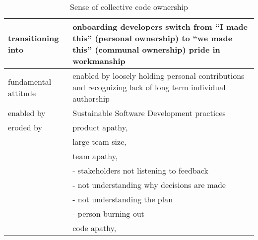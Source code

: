 \documentclass{sig-alternate-05-2015}
\newcommand{\quotes}[1]{``#1''}
\begin{document}
\begin{table*}[]
\centering
\caption{Sense of collective code ownership}
\label{Sense}
\begin{tabular}{p{1.5in}p{5.6in}}

transitioning into         & onboarding developers switch from \quotes{I made this} (personal ownership) to \quotes{we made this} (communal ownership) pride in workmanship \\ \hline
fundamental attitude       & enabled by loosely holding personal contributions and recognizing lack of long term individual authorship                                          \\ \hline
enabled by                 & Sustainable Software Development practices                                                                                                         \\ \hline
eroded by                  & product apathy,                                                                                                                                    \\
                           & large team size,                                                                                                                                   \\
                           & team apathy,                                                                                                                                       \\
                           & - stakeholders not listening to feedback                                                                                                           \\
                           & - not understanding why decisions are made                                                                                                         \\
                           & - not understanding the plan                                                                                                                       \\
                           & - person burning out                                                                                                                               \\
                           & code apathy,                                                                                                                                       \\

\end{tabular}
\end{table*}
\end{document}
